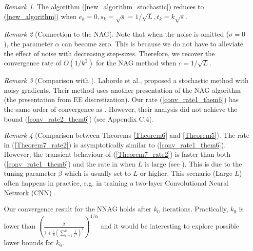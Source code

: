 \documentclass{article}
\theoremstyle{plain}
\theoremstyle{definition}
\theoremstyle{remark}
\newtheorem{remark}{Remark}[theorem]
\begin{document}
\begin{remark}
    The algorithm (\ref{new_algorithm_stochastic}) reduces to (\ref{new_algorithm}) when \(e_k=0, s_k=\sqrt{s}=1/\sqrt{L}, t_k=k\sqrt{s}\).
\end{remark}
\begin{remark}[Connection to the NAG]
    Note that when the noise is omitted ($\sigma=0$), the parameter $\alpha$ can become zero. This is because we do not have to alleviate the effect of noise with decreasing step-sizes. Therefore, we recover the convergence rate of $O(1/k^2)$ for the NAG method when $c=1/\sqrt{L}$.
\end{remark}
\begin{remark}[Comparison with \citep{pmlr-v108-laborde20a}]
    Laborde et al., proposed a stochastic method with noisy gradients. Their method uses another presentation of the NAG algorithm (the presentation from EE discretization). Our rate (\ref{conv_rate1_them6}) has the same order of convergence as \citep{pmlr-v108-laborde20a}. However, their analysis did not achieve the bound (\ref{conv_rate2_them6}) (see \citep{pmlr-v108-laborde20a} Appendix C.4).
\end{remark}






\begin{remark}[Comparison between Theorems \ref{Theorem6} and \ref{Theorem5}]
    The rate in (\ref{Theorem7_rate2}) is asymptotically similar to (\ref{conv_rate1_them6}). However, the transient behaviour of (\ref{Theorem7_rate2}) is faster than both (\ref{conv_rate1_them6}) and the rate in \citep{pmlr-v108-laborde20a} when \(L\) is large (see ). This is due to the tuning parameter \(\beta\) which is usually set to \(L\) or higher. This scenario (Large \(L\)) often happens in practice, e.g. in training a two-layer Convolutional Neural Network (CNN) \citep{shi2022efficiently}. \par
    Our convergence result for the NNAG holds after \(k_0\) iterations. Practically, \(k_0\) is lower than \(\left(\frac{\beta}{1+\tfrac{1}{8}(\sum_{i=1}^{k}\tfrac{1}{i^{\alpha}})^2}\right)^{1/\alpha}\) and it would be interesting to explore possible lower bounds for \(k_0\).
\end{remark}
\end{document}
